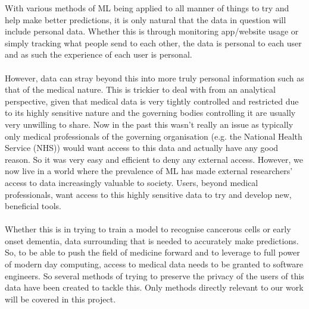 With various methods of ML being applied to all manner of things to try and help make better predictions, it is only natural that the data in question will include personal data. 
Whether this is through monitoring app/website usage or simply tracking what people send to each other, the data is personal to each user and as such the experience of each user is personal. 
\\ \\
However, data can stray beyond this into more truly personal information such as that of the medical nature.
This is trickier to deal with from an analytical perspective, given that medical data is very tightly controlled and restricted due to its highly sensitive nature and the governing bodies controlling it are usually very unwilling to share. 
Now in the past this wasn't really an issue as typically only medical professionals of the governing organisation (e.g. the National Health Service (NHS)) would want access to this data and actually have any good reason. 
So it was very easy and efficient to deny any external access. 
However, we now live in a world where the prevalence of ML has made external researchers' access to data increasingly valuable to society. 
Users, beyond medical professionals, want access to this highly sensitive data to try and develop new, beneficial tools.
\\ \\
Whether this is in trying to train a model to recognise cancerous cells or early onset dementia, data surrounding that is needed to accurately make predictions. 
So, to be able to push the field of medicine forward and to leverage to full power of modern day computing, access to medical data needs to be granted to software engineers.
So several methods of trying to preserve the privacy of the users of this data have been created to tackle this. Only methods directly relevant to our work will be covered in this project.


